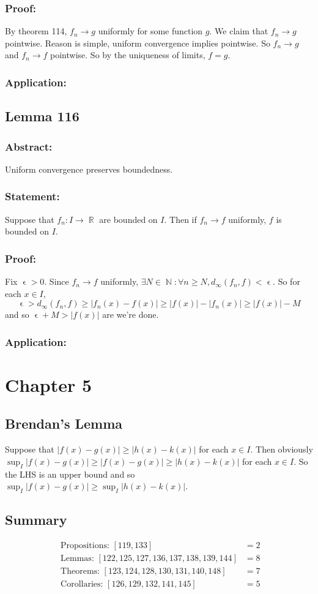 \documentclass{article}
\DeclareMathOperator\eps{\epsilon}
\DeclareMathOperator\R{\mathbb{R}}
\DeclareMathOperator\N{\mathbb{N}}
\begin{document}
\subsubsection*{Proof:}
By theorem 114, $f_n \to g$ uniformly for some function $g$. We claim that
$f_n \to g$ pointwise. Reason is simple, uniform convergence implies pointwise.
So $f_n \to g$ and $f_n \to f$ pointwise. So by the uniqueness of limits, $f = g$.
\subsubsection*{Application:}

\subsection*{Lemma 116}
\subsubsection*{Abstract:}
Uniform convergence preserves boundedness.
\subsubsection*{Statement:}
Suppose that $f_n:I \to \R$ are bounded on $I$. Then if $f_n \to f$
uniformly, $f$ is bounded on $I$.
\subsubsection*{Proof:}
Fix $\eps>0$. Since $f_n \to f$ uniformly,
$\exists N \in \N: \forall n \geq N, d_{\infty}(f_n,f)< \eps$.
So for each $x \in I$, $$
\eps > d_{\infty}(f_n,f) \geq |f_n(x)-f(x)| \geq |f(x)|-|f_n(x)| \geq |f(x)|-M
$$
and so $\eps + M > |f(x)|$ are we're done.
\subsubsection*{Application:}
\section*{Chapter 5}
\subsection*{Brendan's Lemma}
Suppose that $|f(x)-g(x)| \geq |h(x)-k(x)|$ for each $x \in I$. Then
obviously $\sup_I |f(x)-g(x)| \geq |f(x)-g(x)| \geq |h(x)-k(x)|$ for each $x \in I$.
So the LHS is an upper bound and so $\sup_I |f(x)-g(x)| \geq \sup_I |h(x)-k(x)|$.
\subsection*{Summary}
\begin{align*}
\text{ Propositions: } [119,133] &= 2 \\
\text{ Lemmas: } [122,125,127,136,137,138,139,144] &= 8 \\
\text{ Theorems: }  [123,124,128,130,131,140,148] &= 7 \\
\text{ Corollaries: } [126,129,132,141,145] &= 5 \\
\end{align*}
\end{document}
